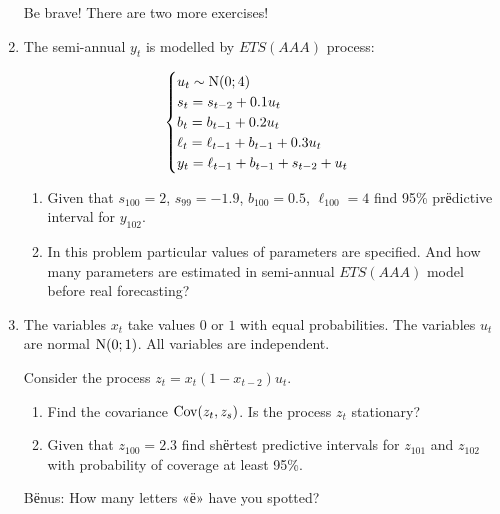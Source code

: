 \begin{enumerate}
    Be brave! There are two more exercises!
    \newpage

    \item The semi-annual $y_t$ is modelled by $ETS(AAA)$ process:
    
    \[
    \begin{cases}
        u_t \sim \mathrm{N}(0; 4) \\
        s_t = s_{t-2} + 0.1 u_t \\
        b_t = b_{t-1} + 0.2 u_t \\
        \ell_t = \ell_{t-1} + b_{t-1} + 0.3 u_t \\
        y_t = \ell_{t-1} + b_{t-1} + s_{t-2} + u_t \\
    \end{cases}    
    \]

    \begin{enumerate}
        \item Given that $s_{100} = 2$, $s_{99} = -1.9$, $b_{100} = 0.5$, $\ell_{100} = 4$ find 95\% prёdictive interval for $y_{102}$. 
        \item In this problem particular values of parameters are specified. And how many parameters are estimated in semi-annual $ETS(AAA)$ model before real forecasting?
    \end{enumerate}

    \item The variables $x_t$ take values $0$ or $1$ with equal probabilities.
    The variables $u_t$ are normal $\mathrm{N}(0; 1)$. All variables are independent.
    
    Consider the process  $z_t = x_t (1-x_{t-2}) u_t$.

    \begin{enumerate}
        \item Find the covariance $\operatorname{Cov}(z_t, z_s)$. Is the process $z_t$ stationary?
        \item Given that $z_{100} = 2.3$ find shёrtest predictive intervals for $z_{101}$ and $z_{102}$ with probability of coverage at least 95\%.
    \end{enumerate}

    \item[Bёnus:] How many letters «ё» have you spotted?
    
 
\end{enumerate}
